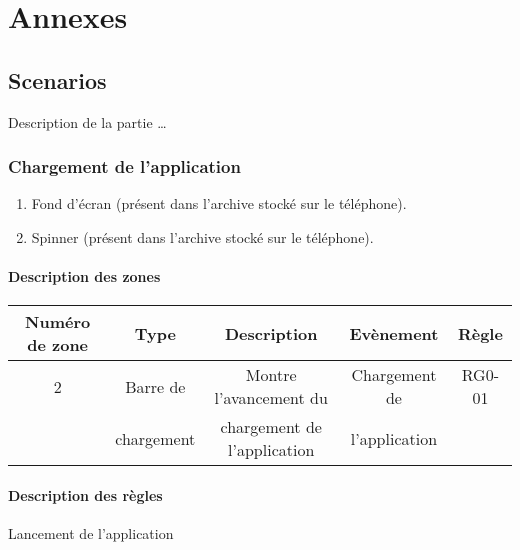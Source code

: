 \documentclass{report}
\begin{document}
\chapter{Annexes}

	\section{Scenarios}
	
		Description de la partie \ldots
		
		\newpage

\newpage
	
	\subsection{Chargement de l'application}
	
		\hypertarget{Chargement de l'application}{}
		\label{Chargement de l'application}

		\begin{center}
			
		\end{center}
		
		\begin{enumerate}
		  \item Fond d'écran (présent dans l'archive stocké sur le téléphone).
		  \item Spinner (présent dans l'archive stocké sur le téléphone).
		\end{enumerate}
		
		\subsubsection{Description des zones}

			\begin{tabular}{|c|c|c|c|c|} \hline
				Numéro de zone & Type  & Description & Evènement &	Règle \\\hline 
				2 & Barre de & Montre l'avancement du & Chargement de & RG0-01\\
				  & chargement & chargement de l'application & l'application &\\\hline
			\end{tabular}
		
		\subsubsection{Description des règles}
		Lancement de l’application 
		
\end{document}
